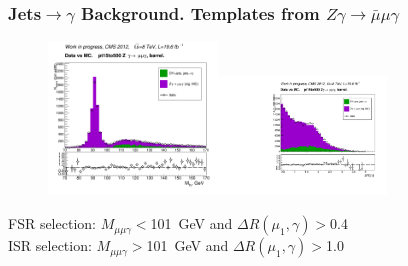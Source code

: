 \begin{frame}\frametitle{Jets$\rightarrow \gamma$ Background. Templates from $Z\gamma\rightarrow{\bar{\mu}}\mu\gamma$}
  \begin{figure}[htb]
    \begin{center}
       \includegraphics[width=0.40\textwidth]{../figs/figs_v11/MUON_ZGamma/PrepareYields/c_TotalDATAvsMC_Barrel__MpholeplepVERY_PRELIMINARY_pt15to500_.png}\includegraphics[width=0.40\textwidth]{../figs/figs_v11/MUON_ZGamma/PrepareYields/c_TotalDATAvsMC_Barrel__lep1PhoDeltaRVERY_PRELIMINARY_pt15to500_.pdf}\\
    \end{center}
  \end{figure}
\scriptize
FSR selection: $M_{\mu\mu\gamma}<$101~GeV and $\Delta R(\mu_{1},\gamma)>$0.4\\
ISR selection: $M_{\mu\mu\gamma}>$101~GeV and $\Delta R(\mu_{1},\gamma)>$1.0

\end{frame}%

